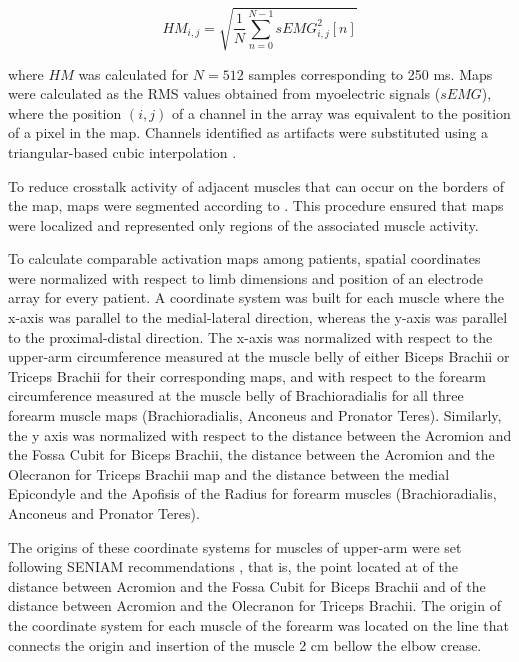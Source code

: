 \begin{equation} \label{eq:2-1}
HM_{i,j} = \sqrt{\frac{1}{N} \sum_{n=0}^{N-1} sEMG_{i,j}^{2}[n] }
\end{equation}

where $HM$ was calculated for $N=512$ samples corresponding to 250 ms. Maps were calculated as the RMS values obtained from myoelectric signals ($sEMG$), where the position $(i,j)$ of a channel in the array was equivalent to the position of a pixel in the map. Channels identified as artifacts were substituted using a triangular-based cubic interpolation \citep{Rojas-Martinez2012}.

To reduce crosstalk activity of adjacent muscles that can occur on the borders of the map, maps were segmented according to \citep{Rojas-Martinez2012}. This procedure ensured that maps were localized and represented only regions of the associated muscle activity.

To calculate comparable activation maps among patients, spatial coordinates were normalized with respect to limb dimensions and position of an electrode array for every patient. A coordinate system was built for each muscle where the x-axis was parallel to the medial-lateral direction, whereas the y-axis was parallel to the proximal-distal direction. The x-axis was normalized with respect to the upper-arm circumference measured at the muscle belly of either Biceps Brachii or Triceps Brachii for their corresponding maps, and with respect to the forearm circumference measured at the muscle belly of Brachioradialis for all three forearm muscle maps (Brachioradialis, Anconeus and Pronator Teres). Similarly, the y axis was normalized with respect to the distance between the Acromion and the Fossa Cubit for Biceps Brachii, the distance between the Acromion and the Olecranon for Triceps Brachii map and the distance between the medial Epicondyle and the Apofisis of the Radius for forearm muscles (Brachioradialis, Anconeus and Pronator Teres).

The origins of these coordinate systems for muscles of upper-arm were set following SENIAM recommendations \citep{Hermens1999}, that is, the point located at  of the distance between Acromion and the Fossa Cubit for Biceps Brachii and  of the distance between Acromion and the Olecranon for Triceps Brachii. The origin of the coordinate system for each muscle of the forearm was located on the line that connects the origin and insertion of the muscle \citep{Kendall1993} 2 cm bellow the elbow crease.

